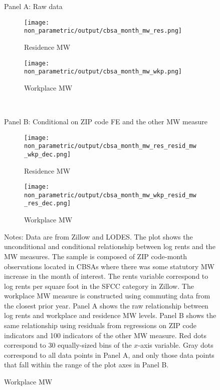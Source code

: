 \begin{figure}[h!]
    \centering
    \caption{Relationship between log rents and the minimum wage measures, 
             sample of affected ZIP code-months}
    \label{fig:non_parametric}
    
    \begin{minipage}{.95\textwidth} \centering
        Panel A: Raw data
        \vspace{1mm}
    \end{minipage}
    \begin{subfigure}{0.5\textwidth}
        \caption*{Residence MW}
        \texttt{[image: non\_parametric/output/cbsa\_month\_mw\_res.png]}
    \end{subfigure}%
    \begin{subfigure}{0.5\textwidth}
        \caption*{Workplace MW}
        \texttt{[image: non\_parametric/output/cbsa\_month\_mw\_wkp.png]}
    \end{subfigure}\\

    \vspace{2mm}
    \begin{minipage}{.95\textwidth} \centering
        Panel B: Conditional on ZIP code FE and the other MW measure
        \vspace{1mm}
    \end{minipage}
    \begin{subfigure}{0.5\textwidth}
        \caption*{Residence MW}
        \texttt{[image: non\_parametric/output/cbsa\_month\_mw\_res\_resid\_mw\_wkp\_dec.png]}
    \end{subfigure}%
    \begin{subfigure}{0.5\textwidth}
        \caption*{Workplace MW}
        \texttt{[image: non\_parametric/output/cbsa\_month\_mw\_wkp\_resid\_mw\_res\_dec.png]}
    \end{subfigure}

    \begin{minipage}{.95\textwidth} \footnotesize
        \vspace{3mm}
        Notes:
        Data are from Zillow and LODES.
        The plot shows the unconditional and conditional relationship between 
        log rents and the MW measures.
        The sample is composed of ZIP code-month observations located in CBSAs 
        where there was some statutory MW increase in the month of interest. 
        The rents variable correspond to log rents per square foot in the SFCC 
        category in Zillow.
        The workplace MW measure is constructed using commuting data from the 
        closest prior year.
        Panel A shows the raw relationship between log rents and workplace 
        and residence MW levels.
        Panel B shows the same relationship using residuals from regressions 
        on ZIP code indicators and 100 indicators of the other MW measure.
        Red dots correspond to 30 equally-sized bins of the $x$-axis variable.
        Gray dots correspond to all data points in Panel A, and only those 
        data points that fall within the range of the plot axes in Panel B.
    \end{minipage}
\end{figure}